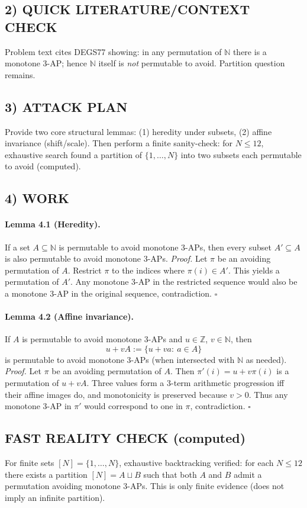 \subsection*{2) QUICK LITERATURE/CONTEXT CHECK}
Problem text cites DEGS77 showing: in any permutation of $\mathbb{N}$ there is a monotone 3-AP; hence $\mathbb{N}$ itself is \emph{not}
permutable to avoid. Partition question remains.

\subsection*{3) ATTACK PLAN}
Provide two core structural lemmas:
(1) heredity under subsets,
(2) affine invariance (shift/scale).
Then perform a finite sanity-check: for $N\le 12$, exhaustive search found a partition of $\{1,\dots,N\}$ into two subsets each permutable to avoid (computed).

\subsection*{4) WORK}

\paragraph{Lemma 4.1 (Heredity).}
If a set $A\subseteq \mathbb{N}$ is permutable to avoid monotone 3-APs, then every subset $A'\subseteq A$ is also permutable to avoid monotone 3-APs.
\textit{Proof.}
Let $\pi$ be an avoiding permutation of $A$. Restrict $\pi$ to the indices where $\pi(i)\in A'$. This yields a permutation of $A'$.
Any monotone 3-AP in the restricted sequence would also be a monotone 3-AP in the original sequence, contradiction. \hfill$\square$

\paragraph{Lemma 4.2 (Affine invariance).}
If $A$ is permutable to avoid monotone 3-APs and $u\in\mathbb{Z}$, $v\in\mathbb{N}$, then
\[
u+vA:=\{u+va:\ a\in A\}
\]
is permutable to avoid monotone 3-APs (when intersected with $\mathbb{N}$ as needed).
\textit{Proof.}
Let $\pi$ be an avoiding permutation of $A$. Then $\pi'(i)=u+v\pi(i)$ is a permutation of $u+vA$.
Three values form a 3-term arithmetic progression iff their affine images do, and monotonicity is preserved because $v>0$.
Thus any monotone 3-AP in $\pi'$ would correspond to one in $\pi$, contradiction. \hfill$\square$

\subsection*{FAST REALITY CHECK (computed)}
For finite sets $[N]=\{1,\dots,N\}$, exhaustive backtracking verified:
for each $N\le 12$ there exists a partition $[N]=A\sqcup B$ such that both $A$ and $B$ admit a permutation avoiding monotone 3-APs.
This is only finite evidence (does not imply an infinite partition).

